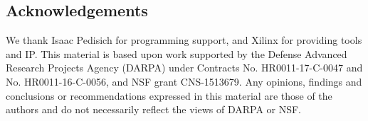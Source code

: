\documentclass[sigconf]{acmart}
\begin{document}



\maketitle








\subsection*{Acknowledgements}
We thank Isaac Pedisich for programming support, and Xilinx for
providing tools and IP.
This material is based upon work supported by the Defense Advanced
Research Projects Agency (DARPA) under Contracts No. HR0011-17-C-0047
and No. HR0011-16-C-0056, and NSF grant CNS-1513679.
Any opinions, findings and conclusions or recommendations expressed in
this material are those of the authors and do not necessarily reflect
the views of DARPA or NSF.



\end{document}
